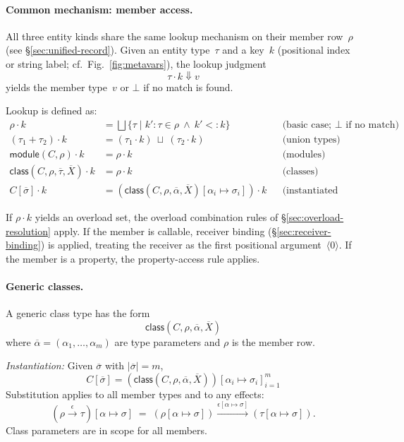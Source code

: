 \paragraph{Common mechanism: member access.}
\label{par:member-access}
All three entity kinds share the same lookup mechanism on their member row~$\rho$ (see \S\ref{sec:unified-record}).  
Given an entity type~$\tau$ and a key~$k$ (positional index or string label; cf.\ Fig.~\ref{fig:metavars}), the lookup judgment
\[
\tau \cdot k \Downarrow v
\]
yields the member type~$v$ or $\bot$ if no match is found.

Lookup is defined as:
\begin{align*}
\rho \cdot k &= \bigsqcup \{\tau \mid k'{:}\tau \in \rho \ \wedge\ k' <: k \}
  &&\text{(basic case; $\bot$ if no match)}\\
(\tau_1 + \tau_2) \cdot k &= (\tau_1 \cdot k) \ \sqcup\ (\tau_2 \cdot k)
  &&\text{(union types)} \\
\mathsf{module}(C, \rho) \cdot k &= \rho \cdot k
  &&\text{(modules)}\\
\mathsf{class}(C, \rho, \overline{\tau}, \overline{X}) \cdot k &= \rho \cdot k
  &&\text{(classes)}\\
C[\overline{\sigma}] \cdot k &= (\mathsf{class}(C, \rho, \overline{\alpha}, \overline{X})[\alpha_i \mapsto \sigma_i]) \cdot k
  &&\text{(instantiated classes)}
\end{align*}

If $\rho \cdot k$ yields an overload set, the overload combination rules of \S\ref{sec:overload-resolution} apply.  
If the member is callable, receiver binding (\S\ref{sec:receiver-binding}) is applied, treating the receiver as the first positional argument~$\langle 0\rangle$.  
If the member is a property, the property-access rule applies.

\paragraph{Generic classes.}
A generic class type has the form
\[
\mathsf{class}(C, \rho, \overline{\alpha}, \overline{X})
\]
where $\overline{\alpha} = (\alpha_1,\dots,\alpha_m)$ are type parameters and $\rho$ is the member row.

\emph{Instantiation:} Given $\overline{\sigma}$ with $|\overline{\sigma}| = m$,
\[
C[\overline{\sigma}] = (\mathsf{class}(C, \rho, \overline{\alpha}, \overline{X}))[\alpha_i \mapsto \sigma_i]_{i=1}^m
\]
Substitution applies to all member types and to any effects:
\[
(\rho \xrightarrow{\epsilon} \tau)[\alpha \mapsto \sigma] \;=\; (\rho[\alpha \mapsto \sigma]) \xrightarrow{\epsilon[\alpha \mapsto \sigma]} (\tau[\alpha \mapsto \sigma]).
\]
Class parameters are in scope for all members.

